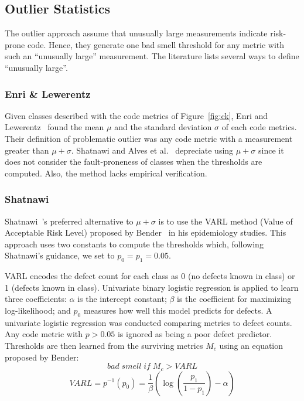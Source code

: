 \documentclass[twocolumn,5p]{elsarticle}
\newcommand{\fig}[1]{Figure~\ref{fig:#1}}
\theoremstyle{break}
\begin{document}
	\subsection{Outlier Statistics}
	
	The outlier approach assume that unusually large measurements indicate risk-prone code.
	Hence, they generate one bad smell threshold for any metric
	with such an ``unusually large'' measurement. 
	The literature lists several ways to define ``unusually large''.
	
	
	
	
	
	\subsubsection{Enri \& Lewerentz}
	Given classes described with the  code metrics of \fig{ck},
	Enri and Lewerentz~\cite{erni96} found the   mean $\mu$ and the standard deviation $\sigma$
	of each
	code metrics. Their definition of problematic outlier was any code
	metric with a measurement greater than $\mu+\sigma$.
	Shatnawi and Alves et al.~\cite{Shatnawi10,Alves2010} depreciate
	using $\mu+\sigma$ since it does not consider the fault-proneness of classes when the thresholds are computed. Also, the method lacks  empirical verification.
	
	\subsubsection{ Shatnawi}
	Shatnawi~\cite{Shatnawi10}'s preferred alternative to $\mu+\sigma$
	is to use the VARL method (Value of Acceptable Risk Level) proposed by Bender~\cite{bender99} in his epidemiology studies.  This approach uses two
	constants to compute the thresholds which, following Shatnawi's guidance, we set to
	$p_0=p_1=0.05$.
	
	VARL encodes the defect count
	for each class as 0 (no defects known in class) or 1 (defects known in class).
	Univariate binary logistic regression is applied to learn three coefficients:  
	$\alpha$ is the intercept constant;
	$\beta$ is the coefficient for maximizing log-likelihood;
	and $p_0$ 
	measures   how well this  model predicts for  defects. A univariate logistic regression was conducted comparing metrics to defect counts. Any code metric with $p>0.05$ is ignored as being a poor defect predictor. Thresholds are then learned from the surviving metrics $M_c$ using
	an equation proposed by Bender:
	$$ \mathit{bad\; smell\; if\;} M_c > VARL$$
	\begin{equation}
		VARL = p^{-1}(p_0) =  \frac{1}{\beta }\left( {\log \left( {\frac{{{p_1}}}{{1 - {p_1}}}} \right) - \alpha } \right) 
	\end{equation}
	
\end{document}
